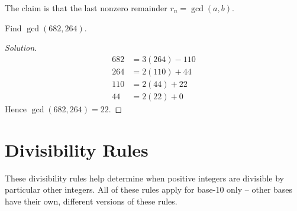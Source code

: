 The claim is that the last nonzero remainder $r_n = \gcd(a,b)$. 

\begin{exmp}{}{}
Find $\gcd(682,264)$.
\end{exmp}
\begin{proof}[Solution]
\begin{align*}
682 &= 3(264) -110 \\
264 &= 2(110) + 44 \\
110 &= 2(44) + 22 \\
44 &= 2(22) + 0
\end{align*}
Hence $\gcd(682,264)=\boxed{22}$.
\end{proof}

\section{Divisibility Rules}
These divisibility rules help determine when positive integers are divisible by particular other integers. All of these rules apply for base-10 only -- other bases have their own, different versions of these rules.

